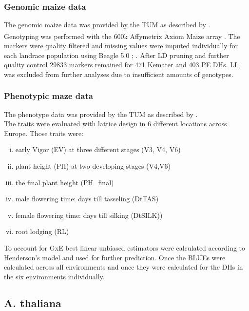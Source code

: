 \subsubsection{Genomic maize data}
The genomic maize data was provided by the TUM as described by \cite{holker2019european}.\\
Genotyping was performed with the 600k Affymetrix\textsuperscript{\textregistered}
Axiom\textsuperscript{\textregistered} Maize array \cite{unterseer2014powerful}. The
markers were quality filtered and missing values were imputed individually for each
landrace population using Beagle 5.0 \cite{browning2007rapid};
\cite{browning2018one}. After LD pruning and further quality control 29833 markers
remained for 471 Kemater and 403 PE DHs. LL was excluded from further analyses due to
insufficient amounts of genotypes.

\subsubsection{Phenotypic maze data}
The phenotype data was provided by the TUM as described by \cite{holker2019european}. \\
The traits were evaluated with lattice design in 6 different locations across
Europe. Those traits were:

\begin{enumerate}[(i)]
\item early Vigor (EV) at three different stages (V3, V4, V6)
\item plant height (PH) at two developing stages (V4,V6)
\item the final plant height (PH\_final)
\item male flowering time: days till tasseling (DtTAS)
\item female flowering time: days till silking (DtSILK)) 
\item root lodging (RL)
\end{enumerate}

To account for GxE best linear unbiased estimators were calculated according to
Henderson's model \cite{henderson1975best} and used for further prediction. Once the BLUEs
were calculated across all environments and once they were calculated for the DHs in the
six environments individually.



\subsection{A. thaliana}

